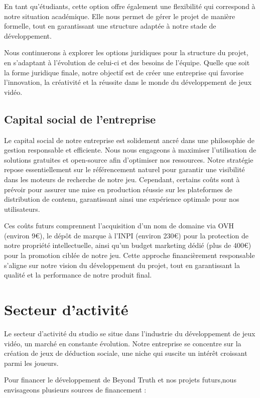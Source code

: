 \documentclass[
	article,			%
	11pt,				%
	oneside,			%
	a4paper,			%
	chapter=TITLE,
	french,			%
	sumario=tradicional
	]{base_nt}
\begin{document}
En tant qu'étudiants, cette option offre également une flexibilité qui correspond à notre situation académique. Elle nous permet de gérer le projet de manière formelle, tout en garantissant une structure adaptée à notre stade de développement.

Nous continuerons à explorer les options juridiques pour la structure du projet, en s'adaptant à l'évolution de celui-ci et des besoins de l'équipe. Quelle que soit la forme juridique finale, notre objectif est de créer une entreprise qui favorise l'innovation, la créativité et la réussite dans le monde du développement de jeux vidéo.

\subsection{Capital social de l'entreprise}

Le capital social de notre entreprise est solidement ancré dans une philosophie de gestion responsable et efficiente. Nous nous engageons à maximiser l'utilisation de solutions gratuites et open-source afin d'optimiser nos ressources. Notre stratégie repose essentiellement sur le référencement naturel pour garantir une visibilité dans les moteurs de recherche de notre jeu. Cependant, certains coûts sont à prévoir pour assurer une mise en production réussie sur les plateformes de distribution de contenu, garantissant ainsi une expérience optimale pour nos utilisateurs. 

Ces coûts futurs comprennent l'acquisition d'un nom de domaine via OVH (environ 9€), le dépôt de marque à l'INPI (environ 230€) pour la protection de notre propriété intellectuelle, ainsi qu'un budget marketing dédié (plus de 400€) pour la promotion ciblée de notre jeu. Cette approche financièrement responsable s'aligne sur notre vision du développement du projet, tout en garantissant la qualité et la performance de notre produit final.

\section{Secteur d'activité}

Le secteur d'activité du studio se situe dans l'industrie du développement de jeux vidéo, un marché en constante évolution. Notre entreprise se concentre sur la création de jeux de déduction sociale, une niche qui suscite un intérêt croissant parmi les joueurs.

Pour financer le développement de Beyond Truth et nos projets futurs,nous envisageons plusieurs sources de financement :
\end{document}
